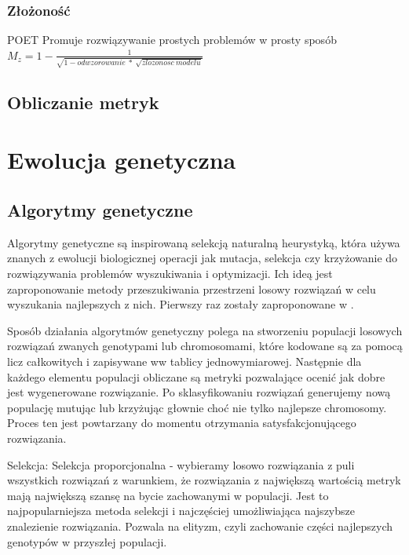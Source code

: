 \subsubsection{Złożoność}
POET
Promuje rozwiązywanie prostych problemów w prosty sposób \newline
$M_z = 1 - \frac{1}{\sqrt{1 - odwzorowanie\ *\ \sqrt{zlozonosc\ modelu}}} $

\subsection{Obliczanie metryk}



\section{Ewolucja genetyczna}
\label{sec:ewolucjaGenetyczne}
\subsection{Algorytmy genetyczne}
\cite{ryan_collins_neill_1998}
Algorytmy genetyczne są inspirowaną selekcją naturalną  heurystyką, która używa znanych z ewolucji biologicznej operacji jak mutacja, selekcja czy krzyżowanie do rozwiązywania problemów wyszukiwania i optymizacji. Ich ideą jest zaproponowanie metody przeszukiwania przestrzeni losowy rozwiązań w celu wyszukania najlepszych z nich. Pierwszy raz zostały zaproponowane w \cite{10.5555/138936}.

Sposób działania algorytmów genetyczny polega na stworzeniu populacji losowych rozwiązań zwanych genotypami lub chromosomami, które kodowane są za pomocą licz całkowitych i zapisywane ww tablicy jednowymiarowej. Następnie dla każdego elementu populacji obliczane są metryki pozwalające ocenić jak dobre jest wygenerowane rozwiązanie. Po sklasyfikowaniu rozwiązań generujemy nową populację mutując lub krzyżując głownie choć nie tylko najlepsze chromosomy. Proces ten jest powtarzany do momentu otrzymania satysfakcjonującego rozwiązania.  

Selekcja:
Selekcja proporcjonalna - wybieramy losowo rozwiązania z puli wszystkich rozwiązań z warunkiem, że rozwiązania z największą wartością metryk mają największą szansę na bycie zachowanymi w populacji. Jest to najpopularniejsza metoda selekcji i najczęściej umożliwiająca najszybsze znalezienie rozwiązania. Pozwala na elityzm, czyli zachowanie części najlepszych genotypów w przyszłej populacji.

